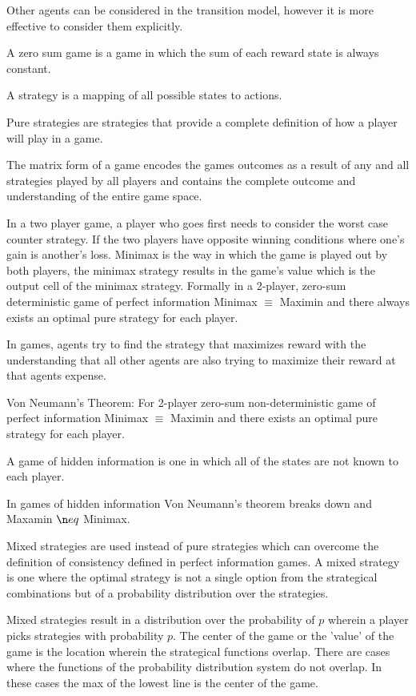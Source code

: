 \documentclass{article}
\begin{document}
Other agents can be considered in the transition model, however it is more 
effective to consider them explicitly.

A zero sum game is a game in which the sum of each reward state is always
constant. 

A strategy is a mapping of all possible states to actions.

Pure strategies are strategies that provide a complete definition of how a
player will play in a game.

The matrix form of a game encodes the games outcomes as a result of any and all
strategies played by all players and contains the complete outcome and
understanding of the entire game space. 

In a two player game, a player who goes first needs to consider the worst case
counter strategy. If the two players have opposite winning conditions where 
one's gain is another's loss. Minimax is the way in which the game is played out
by both players, the minimax strategy results in the game's value which is the
output cell of the minimax strategy. Formally in a 2-player, zero-sum
deterministic game of perfect information Minimax $\equiv$ Maximin and there 
always exists an optimal pure strategy for each player. 

In games, agents try to find the strategy that maximizes reward with the 
understanding that all other agents are also trying to maximize their reward at
that agents expense. 

Von Neumann's Theorem: For 2-player zero-sum non-deterministic game of perfect
information Minimax $\equiv$ Maximin and there exists an optimal pure strategy
for each player. 

A game of hidden information is one in which all of the states are not known
to each player. 

In games of hidden information Von Neumann's theorem breaks down and Maxamin $\n
eq$ Minimax.

Mixed strategies are used instead of pure strategies which can overcome the 
definition of consistency defined in perfect information games. A mixed strategy
is one where the optimal strategy is not a single option from the strategical 
combinations but of a probability distribution over the strategies.

Mixed strategies result in a distribution over the probability of $p$ wherein a
player picks strategies with probability $p$. The center of the game or the 
'value' of the game is the location wherein the strategical functions overlap.
There are cases where the functions of the probability distribution system do 
not overlap. In these cases the max of the lowest line is the center of the
game. 
\end{document}
